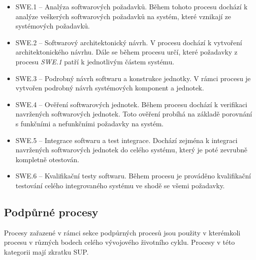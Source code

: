 \documentclass[czech,master]{diploma}
\begin{document}
\begin{itemize}
	\item SWE.1 -- Analýza softwarových požadavků. Během tohoto procesu dochází k analýze veškerých softwarových požadavků na systém, které vznikají ze systémových požadavků.
	\item SWE.2 -- Softwarový architektonický návrh. V procesu dochází k vytvoření architektonického návrhu. Dále se během procesu určí, které požadavky z procesu \textit{SWE.1} patří k jednotlivým částem systému.
	\item SWE.3 -- Podrobný návrh softwaru a konstrukce jednotky. V rámci procesu je vytvořen podrobný návrh systémových komponent a jednotek.
	\item SWE.4 -- Ověření softwarových jednotek. Během procesu dochází k verifikaci navržených softwarových jednotek. Toto ověření probíhá na základě porovnání s funkčními a nefunkčními požadavky na systém.
	\item SWE.5 -- Integrace softwaru a test integrace. Dochází zejména k integraci navržených softwarových jednotek do celého systému, který je poté zevrubně kompletně otestován.
	\item SWE.6 -- Kvalifikační testy softwaru. Během procesu je prováděno kvalifikační testování celého integrovaného systému ve shodě se všemi požadavky.
\end{itemize}

\subsection{Podpůrné procesy}
Procesy zařazené v rámci sekce podpůrných procesů jsou použity v kterémkoli procesu v různých bodech celého vývojového životního cyklu. Procesy v této kategorii mají zkratku SUP.
\end{document}
